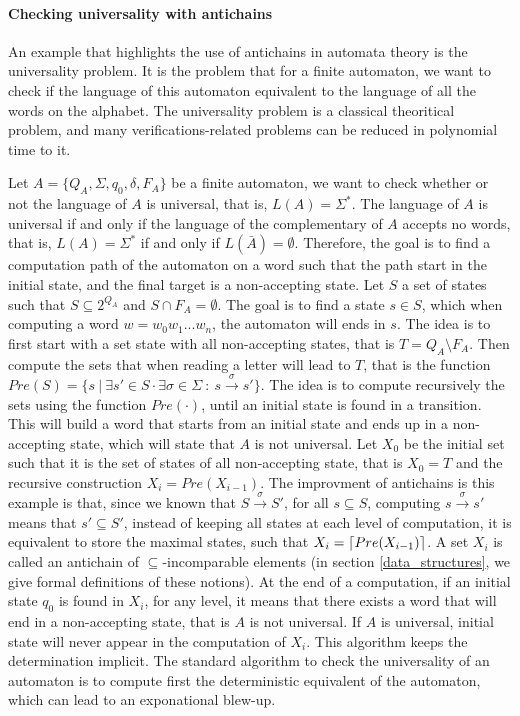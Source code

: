 \documentclass[letterpaper]{article}
\DeclarePairedDelimiter{\ceil}{\lceil}{\rceil}
\theoremstyle{definition}
\begin{document}
\paragraph{Checking universality with antichains}

An example that highlights the use of antichains in automata theory is
the universality problem.
It is the problem that for a finite automaton, we want to
check if the language of this automaton equivalent to the language
of all the words on the alphabet. The universality problem is a classical
theoritical problem, and many verifications-related problems can be
reduced in polynomial time to it.

Let $A = \{Q_A, \Sigma, q_0, \delta, F_A\}$ be a finite automaton,
we want to check whether or not
the language of $A$ is universal, that is, $L(A) = \Sigma^*$.
The language of $A$ is universal if and only if the language
of the complementary of $A$ accepts no words, that is,
$L(A) = \Sigma^*$ if and only if $L(\bar{A}) = \emptyset$.
Therefore, the goal is to find a computation path of the
automaton on a word such that the path start in the initial state,
and the final target is a non-accepting state.
Let $S$ a set of states such that $S \subseteq 2^{Q_A}$ and
$S \cap F_A = \emptyset$. The goal is to find a state $s \in S$,
which when computing a word $w = w_0w_1...w_n$, the automaton will ends
in $s$. The idea is to first start with a set state with all non-accepting
states, that is $T = Q_A \setminus F_A$. Then compute the sets that
when reading a letter will lead to $T$, that is the function
$Pre(S) = \{s \ | \ \exists s' \in S \cdot \exists \sigma \in \Sigma \ :
\ s \xrightarrow{\sigma} s'\}$.
The idea is to compute recursively
the sets using the function $Pre(\cdot)$, until an initial state
is found in a transition. This will build a word that starts
from an initial state and ends up in a non-accepting state,
which will state that $A$ is not universal.
 Let $X_0$ be the initial set such that
it is the set of states of all non-accepting state, that is $X_0 = T$
and the recursive construction $X_i = Pre(X_{i-1})$. The improvment
of antichains is this example is that, since we
known that $S \xrightarrow{\sigma}
S'$, for all $s \subseteq S$, computing $s \xrightarrow{\sigma} s'$
means that $s' \subseteq S'$, instead of keeping all states
at each level of computation, it is equivalent to store the maximal
states, such that $X_i = \ceil{Pre(X_{i-1})}$. A set
$X_i$ is called an antichain
of $\subseteq$-incomparable elements
(in section \ref{data_structures},
we give formal definitions of these notions). At the end of a computation,
if an initial state $q_0$ is found in $X_i$, for any level,
it means that there exists a word that will end in a non-accepting state,
that is $A$ is not universal. If $A$ is universal, initial state will never
appear in the computation of $X_i$.
This algorithm keeps the determination implicit.
The standard algorithm to check the universality of an automaton
is to compute first the deterministic equivalent of the automaton, which
can lead to an exponational blew-up.
\end{document}
